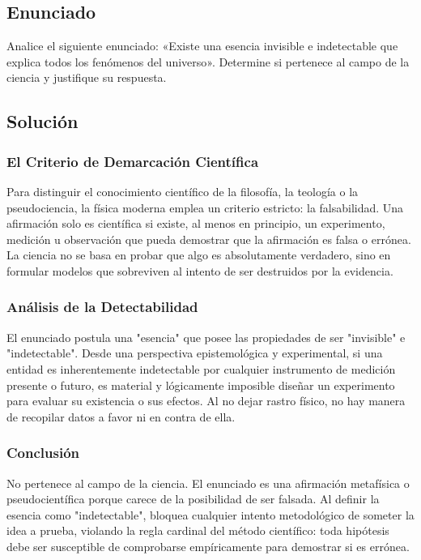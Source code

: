 \documentclass[12pt, a4paper]{article}
\begin{document}
\newpage

\subsection*{Enunciado}
Analice el siguiente enunciado: «Existe una esencia invisible e indetectable que explica todos los fenómenos del universo». Determine si pertenece al campo de la ciencia y justifique su respuesta.

\subsection*{Solución}

\subsubsection*{El Criterio de Demarcación Científica}
Para distinguir el conocimiento científico de la filosofía, la teología o la pseudociencia, la física moderna emplea un criterio estricto: la falsabilidad. Una afirmación solo es científica si existe, al menos en principio, un experimento, medición u observación que pueda demostrar que la afirmación es falsa o errónea. La ciencia no se basa en probar que algo es absolutamente verdadero, sino en formular modelos que sobreviven al intento de ser destruidos por la evidencia.

\subsubsection*{Análisis de la Detectabilidad}
El enunciado postula una "esencia" que posee las propiedades de ser "invisible" e "indetectable". Desde una perspectiva epistemológica y experimental, si una entidad es inherentemente indetectable por cualquier instrumento de medición presente o futuro, es material y lógicamente imposible diseñar un experimento para evaluar su existencia o sus efectos. Al no dejar rastro físico, no hay manera de recopilar datos a favor ni en contra de ella. 

\subsubsection*{Conclusión}
No pertenece al campo de la ciencia. El enunciado es una afirmación metafísica o pseudocientífica porque carece de la posibilidad de ser falsada. Al definir la esencia como "indetectable", bloquea cualquier intento metodológico de someter la idea a prueba, violando la regla cardinal del método científico: toda hipótesis debe ser susceptible de comprobarse empíricamente para demostrar si es errónea.
\end{document}
